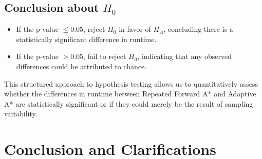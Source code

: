 \documentclass{article}
\begin{document}
\subsection{Conclusion about \(H_0\)}
\begin{itemize}
    \item If the p-value \(\leq 0.05\), reject \(H_0\) in favor of \(H_A\), concluding there is a statistically significant difference in runtime.
    \item If the p-value \(> 0.05\), fail to reject \(H_0\), indicating that any observed differences could be attributed to chance.
\end{itemize}

This structured approach to hypothesis testing allows us to quantitatively assess whether the differences in runtime between Repeated Forward A* and Adaptive A* are statistically significant or if they could merely be the result of sampling variability.

\section {Conclusion and Clarifications}
\end{document}
